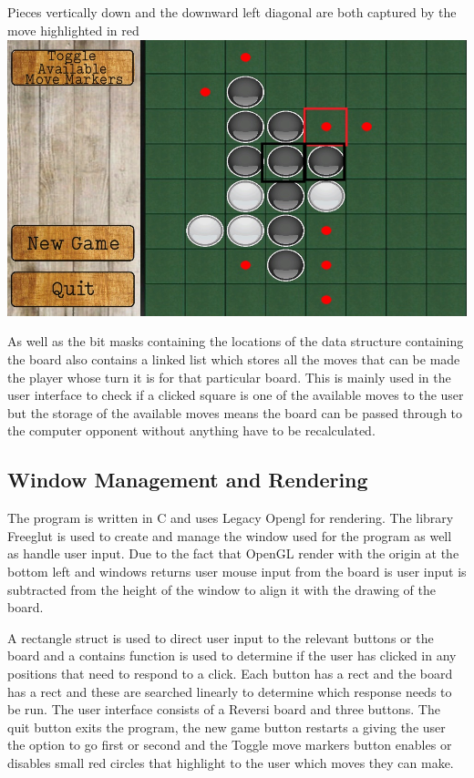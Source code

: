 \documentclass[final]{cmpreport}
\begin{document}
\begin{cmpfigure}[htb]{Pieces vertically down and the downward left diagonal are both captured by the move highlighted in red}
	\includegraphics[scale=0.5]{capture.jpg}
\end{cmpfigure}  
\FloatBarrier

As well as the bit masks containing the locations of the data structure containing the board also contains a linked list which stores all the moves that can be made the player whose turn it is for that particular board. This is mainly used in the user interface to check if a clicked square is one of the available moves to the user but the storage of the available moves means the board can be passed through to the computer opponent without anything have to be recalculated.   
\subsection{Window Management and Rendering}
The program is written in C and uses Legacy Opengl for rendering. The library Freeglut is used to create and manage the window used for the program as well as handle user input. Due to the fact that OpenGL render with the origin at the bottom left and windows returns user mouse input from the board is user input is subtracted from the height of the window to align it with the drawing of the board. 

A rectangle struct is used to direct user input to the relevant buttons or the board and a contains function is used to determine if the user has clicked in any positions that need to respond to a click. Each button has a rect and the board has a rect and these are searched linearly to determine which response needs to be run. The user interface consists of a Reversi board and three buttons. The quit button exits the program, the new game button restarts a giving the user the option to go first or second and the Toggle move markers button enables or disables small red circles that highlight to the user which moves they can make.
\end{document}

